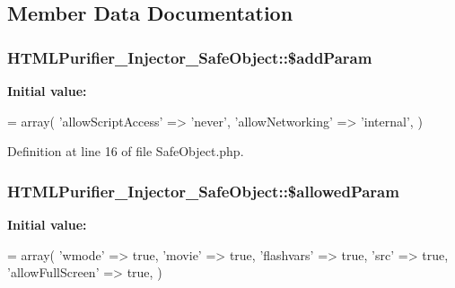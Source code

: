\subsection{Member Data Documentation}
\hypertarget{classHTMLPurifier__Injector__SafeObject_a4cc4bca85bac5284f96605d07c3ca6b3}{
\subsubsection[{\$add\+Param}]{\setlength{\rightskip}{0pt plus 5cm}H\+T\+M\+L\+Purifier\+\_\+\+Injector\+\_\+\+Safe\+Object\+::\$add\+Param\hspace{0.3cm}{\ttfamily [protected]}}}\label{classHTMLPurifier__Injector__SafeObject_a4cc4bca85bac5284f96605d07c3ca6b3}
{\bfseries Initial value\+:}
\begin{DoxyCode}
= array(
        \textcolor{stringliteral}{'allowScriptAccess'} => \textcolor{stringliteral}{'never'},
        \textcolor{stringliteral}{'allowNetworking'} => \textcolor{stringliteral}{'internal'},
    )
\end{DoxyCode}


Definition at line 16 of file Safe\+Object.\+php.

\hypertarget{classHTMLPurifier__Injector__SafeObject_ac54a17d6c45bbe420addf00ca8a0da6c}{
\subsubsection[{\$allowed\+Param}]{\setlength{\rightskip}{0pt plus 5cm}H\+T\+M\+L\+Purifier\+\_\+\+Injector\+\_\+\+Safe\+Object\+::\$allowed\+Param\hspace{0.3cm}{\ttfamily [protected]}}}\label{classHTMLPurifier__Injector__SafeObject_ac54a17d6c45bbe420addf00ca8a0da6c}
{\bfseries Initial value\+:}
\begin{DoxyCode}
= array(
        \textcolor{stringliteral}{'wmode'} => \textcolor{keyword}{true},
        \textcolor{stringliteral}{'movie'} => \textcolor{keyword}{true},
        \textcolor{stringliteral}{'flashvars'} => \textcolor{keyword}{true},
        \textcolor{stringliteral}{'src'} => \textcolor{keyword}{true},
        \textcolor{stringliteral}{'allowFullScreen'} => \textcolor{keyword}{true}, 
    )
\end{DoxyCode}


